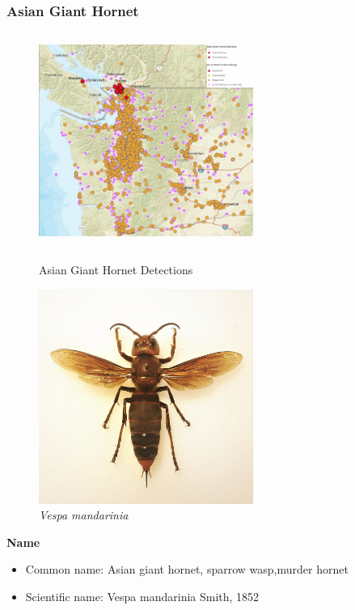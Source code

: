 \documentclass[12pt]{article}
\begin{document}
\subsubsection{Asian Giant Hornet  }
\begin{figure}[!htbp]
	\small
	\centering
	\begin{minipage}{8cm}
		\includegraphics[width=7cm,height=7cm]{./pictures/dist0.png}
		\caption{ Asian Giant Hornet Detections\cite{website}}\label{nt}
	\end{minipage}
	\begin{minipage}{8cm}
		\includegraphics[width=7cm,height=7cm]{./pictures/wikiintro.jpg}
		\caption{\emph{Vespa mandarinia}\cite{wiki}}\label{nt}
	\end{minipage}
	
\end{figure}

\textbf{Name}
\begin{itemize}
	\item Common name:  Asian giant hornet, sparrow wasp,murder hornet
	\item Scientific name: Vespa mandarinia Smith, 1852
\end{itemize}
\end{document}
